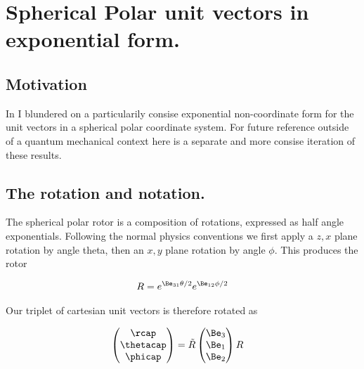 

\chapter{Spherical Polar unit vectors in exponential form.}
\label{chap:sphericalPolarUnit}
{}
\date{Sept 20, 2009}

\beginArtWithToc

\section{Motivation}

In  I blundered on a particularily consise exponential non-coordinate form for the unit vectors in a spherical polar coordinate system.  For future reference outside of a quantum mechanical context here is a separate and more consise iteration of these results.

\section{The rotation and notation.}

The spherical polar rotor is a composition of rotations, expressed as half angle exponentials.  Following the normal physics conventions we first apply a $z,x$ plane rotation by angle theta, then an $x,y$ plane rotation by angle $\phi$.  This produces the rotor

\begin{align}\label{eqn:sphericalPolarUnit:angExp1}
R = e^{\Be_{31}\theta/2} e^{\Be_{12}\phi/2}
\end{align}

Our triplet of cartesian unit vectors is therefore rotated as

\begin{align}\label{eqn:sphericalPolarUnit:goo14}
\begin{pmatrix}
\rcap \\
\thetacap \\
\phicap \\
\end{pmatrix}
&=
\tilde{R}
\begin{pmatrix}
\Be_3 \\
\Be_1 \\
\Be_2 \\
\end{pmatrix}
R
\end{align}

